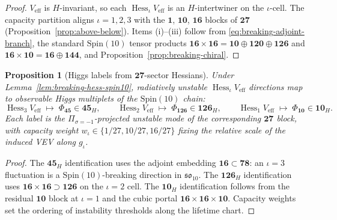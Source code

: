 \documentclass[aps,prd,onecolumn,amsmath,amssymb,nofootinbib,11pt]{revtex4-2}
\numberwithin{equation}{section}
\theoremstyle{plain}
\newtheorem{proposition}[theorem]{Proposition}
\theoremstyle{definition}
\theoremstyle{remark}
\newcommand{\Spin}{\mathrm{Spin}}
\newcommand{\Hess}{\operatorname{Hess}}
\begin{document}
\begin{proof}
$V_{\mathrm{eff}}$ is $H$-invariant, so each $\Hess_\iota V_{\mathrm{eff}}$ is
an $H$-intertwiner on the $\iota$-cell. The capacity partition aligns
$\iota=1,2,3$ with the $\mathbf{1}$, $\mathbf{10}$, $\mathbf{16}$ blocks of
$\mathbf{27}$ (Proposition~\ref{prop:above-below}). Items (i)--(iii) follow
from \eqref{eq:breaking-adjoint-branch}, the standard $\Spin(10)$ tensor
products $\mathbf{16}\times\mathbf{16}=\mathbf{10}\oplus\mathbf{120}\oplus
\mathbf{126}$ and $\mathbf{16}\times\mathbf{10}=\mathbf{16}\oplus\mathbf{144}$,
and Proposition~\ref{prop:breaking-chiral}.
\end{proof}

\begin{proposition}[Higgs labels from $\mathbf{27}$-sector Hessians]
\label{prop:breaking-higgs-labels}
Under Lemma~\ref{lem:breaking-hess-spin10}, radiatively unstable
$\Hess_\iota V_{\mathrm{eff}}$ directions map to observable Higgs multiplets
of the $\Spin(10)$ chain:
\begin{equation}\label{eq:breaking-higgs-map}
  \Hess_3 V_{\mathrm{eff}}\;\longmapsto\;\Phi_{\mathbf{45}}\in\mathbf{45}_H,
  \qquad
  \Hess_2 V_{\mathrm{eff}}\;\longmapsto\;\Phi_{\mathbf{126}}\in\mathbf{126}_H,
  \qquad
  \Hess_1 V_{\mathrm{eff}}\;\longmapsto\;\Phi_{\mathbf{10}}\in\mathbf{10}_H.
\end{equation}
Each label is the $\Pi_{\sigma=-1}$-projected unstable mode of the
corresponding $\mathbf{27}$ block, with capacity weight
$w_\iota\in\{1/27,10/27,16/27\}$ fixing the relative scale of the induced
VEV along $g_\iota$.
\end{proposition}

\begin{proof}
The $\mathbf{45}_H$ identification uses the adjoint embedding
$\mathbf{16}\subset\mathbf{78}$: an $\iota=3$ fluctuation is a
$\Spin(10)$-breaking direction in $\mathfrak{so}_{10}$. The $\mathbf{126}_H$
identification uses $\mathbf{16}\times\mathbf{16}\supset\mathbf{126}$ on the
$\iota=2$ cell. The $\mathbf{10}_H$ identification follows from the residual
$\mathbf{10}$ block at $\iota=1$ and the cubic portal
$\mathbf{16}\times\mathbf{16}\times\mathbf{10}$. Capacity weights set the
ordering of instability thresholds along the lifetime chart.
\end{proof}
\end{document}
